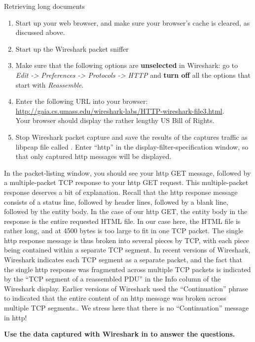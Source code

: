 \begin{exercise}{Retrieving long documents}
\begin{enumerate}
	\item Start up your web browser, and make sure your browser’s cache is cleared, as discussed above. 
	\item Start up the Wireshark packet sniffer 
	\item Make sure that the following options are \textbf{unselected} in Wireshark: go to \emph{Edit -> Preferences -> Protocols -> HTTP} and \textbf{turn off} all the options that start with \emph{Reassemble}.
	\item Enter the following URL into your browser:\\ \url{http://gaia.cs.umass.edu/wireshark-labs/HTTP-wireshark-file3.html}.\\
	Your browser should display the rather lengthy US Bill of Rights. 
	\item Stop Wireshark packet capture and save the results of the captures traffic as libpcap file called . Enter ``http'' in the display-filter-specification window, so that only captured \ac{http} messages will be displayed. 
\end{enumerate}

In the packet-listing window, you should see your \ac{http} GET message, followed by a multiple-packet TCP response to your \ac{http} GET request. This multiple-packet response deserves a bit of explanation. Recall that the \ac{http} response message consists of a status line, followed by header lines, followed by a blank line, followed by the entity body. In the case of our \ac{http} GET, the entity body in the response is the entire requested HTML file. In our case here, the HTML file is rather long, and at 4500 bytes is too large to fit in one TCP packet. The single \ac{http} response message is thus broken into several pieces by TCP, with each piece being contained within a separate TCP segment. In recent versions of Wireshark, Wireshark indicates each TCP segment as a separate packet, and the fact that the single \ac{http} response was fragmented across multiple TCP packets is indicated by the ``TCP segment of a reassembled PDU'' in the Info column of the Wireshark display. Earlier versions of Wireshark used the ``Continuation'' phrase to indicated that the entire content of an \ac{http} message was broken across multiple TCP segments.. We stress here that there is no ``Continuation'' message in \ac{http}!

\textbf{Use the data captured with Wireshark in  to answer the questions.}

\end{exercise}


